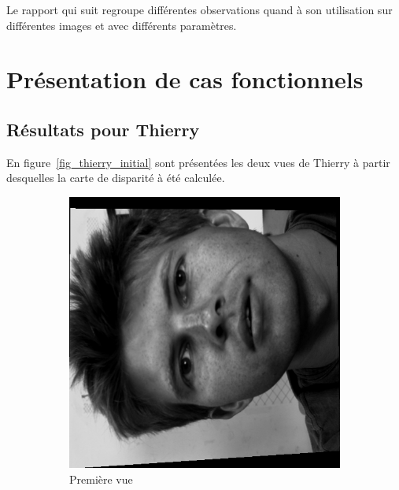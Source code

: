 \documentclass[12pt,a4paper,onecolumn]{article}
\begin{document}
Le rapport qui suit regroupe différentes observations quand à son utilisation sur différentes images et avec différents paramètres.

\section{Présentation de cas fonctionnels}

\subsection{Résultats pour Thierry}

En figure~\ref{fig_thierry_initial} sont présentées les deux vues de Thierry à partir desquelles la carte de disparité à été calculée.

\begin{figure}[H]
	\centering
	\begin{subfigure}[b]{0.45\textwidth}
		\centering
		\includegraphics[width = \textwidth, angle = -90]{face00R}
		\caption{Première vue}
		\label{fig_thierry_1}
	\end{subfigure}
	\centering
	\begin{subfigure}[b]{0.45\textwidth}
		\centering

\end{subfigure}
\end{figure}
\end{document}
